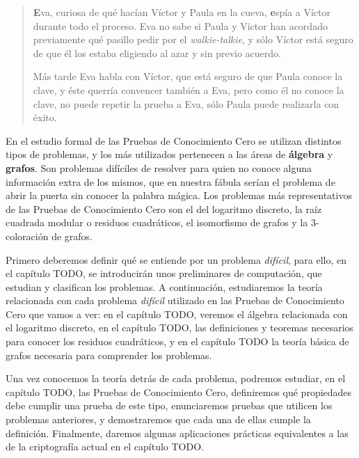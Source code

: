 \begin{quote}
\textbf{E}va, curiosa de qué hacían Víctor y Paula en la cueva, \textbf{e}spía a Víctor durante todo el proceso. Eva no sabe si Paula y Víctor han acordado previamente qué pasillo pedir por el \textit{walkie-talkie}, y sólo Víctor está seguro de que él los estaba eligiendo al azar y sin previo acuerdo.%

Más tarde Eva habla con Víctor, que está seguro de que Paula conoce la clave, y éste querría convencer también a Eva, pero como él no conoce la clave, no puede repetir la prueba a Eva, sólo Paula puede realizarla con éxito.
\end{quote}


\hfil

En el estudio formal de las Pruebas de Conocimiento Cero se utilizan distintos tipos de problemas, y los más utilizados pertenecen a las áreas de \textbf{álgebra} y \textbf{grafos}. Son problemas difíciles de resolver para quien no conoce alguna información extra de los mismos, que en nuestra fábula serían el problema de abrir la puerta sin conocer la palabra mágica. Los problemas más representativos de las Pruebas de Conocimiento Cero son el del logaritmo discreto, la raíz cuadrada modular o residuos cuadráticos, el isomorfismo de grafos y la 3-coloración de grafos.

Primero deberemos definir qué se entiende por un problema \textit{difícil}, para ello, en el capítulo TODO, se introducirán unos preliminares de computación, que estudian y clasifican los problemas. A continuación, estudiaremos la teoría relacionada con cada problema \textit{difícil} utilizado en las Pruebas de Conocimiento Cero que vamos a ver: en el capítulo TODO, veremos el álgebra relacionada con el logaritmo discreto, en el capítulo TODO, las definiciones y teoremas necesarios para conocer los residuos cuadráticos, y en el capítulo TODO la teoría básica de grafos necesaria para comprender los problemas.

Una vez conocemos la teoría detrás de cada problema, podremos estudiar, en el capítulo TODO, las Pruebas de Conocimiento Cero, definiremos qué propiedades debe cumplir una prueba de este tipo, enunciaremos pruebas que utilicen los problemas anteriores, y demostraremos que cada una de ellas cumple la definición. Finalmente, daremos algunas aplicaciones prácticas equivalentes a las de la criptografía actual en el capítulo TODO.


